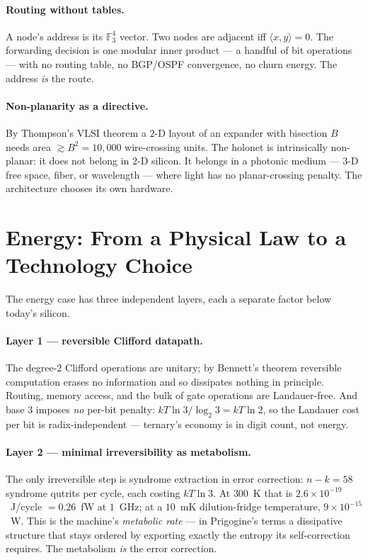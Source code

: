 \documentclass[11pt]{article}
\begin{document}
\paragraph{Routing without tables.} A node's address is its $\mathbb{F}_3^4$ vector. Two nodes are
adjacent iff $\langle x,y\rangle = 0$. The forwarding decision is one modular inner product --- a
handful of bit operations --- with no routing table, no BGP/OSPF convergence, no churn energy. The
address \emph{is} the route.

\paragraph{Non-planarity as a directive.} By Thompson's VLSI theorem a $2$-D layout of an expander with
bisection $B$ needs area $\gtrsim B^2 = 10{,}000$ wire-crossing units. The holonet is intrinsically
non-planar: it does not belong in $2$-D silicon. It belongs in a photonic medium --- $3$-D free space,
fiber, or wavelength --- where light has no planar-crossing penalty. The architecture chooses its own
hardware.

\section{Energy: From a Physical Law to a Technology Choice}
\label{sec:energy}
The energy case has three independent layers, each a separate factor below today's silicon.

\paragraph{Layer 1 --- reversible Clifford datapath.} The degree-$2$ Clifford operations are unitary;
by Bennett's theorem reversible computation erases no information and so dissipates nothing in
principle. Routing, memory access, and the bulk of gate operations are Landauer-free. And base $3$
imposes \emph{no} per-bit penalty: $kT\ln 3/\log_2 3 = kT\ln 2$, so the Landauer cost per bit is
radix-independent --- ternary's economy is in digit count, not energy.

\paragraph{Layer 2 --- minimal irreversibility as metabolism.} The only irreversible step is syndrome
extraction in error correction: $n-k=58$ syndrome qutrits per cycle, each costing $kT\ln 3$. At
$300$~K that is $2.6\times10^{-19}$~J/cycle $= 0.26$~fW at $1$~GHz; at a $10$~mK dilution-fridge
temperature, $9\times10^{-15}$~W. This is the machine's \emph{metabolic rate} --- in Prigogine's terms a
dissipative structure that stays ordered by exporting exactly the entropy its self-correction requires.
The metabolism \emph{is} the error correction.
\end{document}
